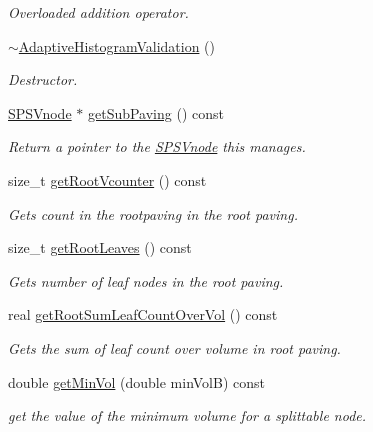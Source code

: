 \begin{DoxyCompactItemize}
\begin{DoxyCompactList}\small\item\em \-Overloaded addition operator. \end{DoxyCompactList}\item 
\hyperlink{classsubpavings_1_1AdaptiveHistogramValidation_a26664847dd161cb938bddb579946b018}{$\sim$\-Adaptive\-Histogram\-Validation} ()
\begin{DoxyCompactList}\small\item\em \-Destructor. \end{DoxyCompactList}\item 
\hyperlink{classsubpavings_1_1SPSVnode}{\-S\-P\-S\-Vnode} $\ast$ \hyperlink{classsubpavings_1_1AdaptiveHistogramValidation_a6449b127c16423141cbed8f193cfcf59}{get\-Sub\-Paving} () const 
\begin{DoxyCompactList}\small\item\em \-Return a pointer to the \hyperlink{classsubpavings_1_1SPSVnode}{\-S\-P\-S\-Vnode} this manages. \end{DoxyCompactList}\item 
size\-\_\-t \hyperlink{classsubpavings_1_1AdaptiveHistogramValidation_a23a25c2169c94e019859f8efc2657c1b}{get\-Root\-Vcounter} () const 
\begin{DoxyCompactList}\small\item\em \-Gets count in the rootpaving in the root paving. \end{DoxyCompactList}\item 
size\-\_\-t \hyperlink{classsubpavings_1_1AdaptiveHistogramValidation_abba9be0456a1228037dd40e7353d2169}{get\-Root\-Leaves} () const 
\begin{DoxyCompactList}\small\item\em \-Gets number of leaf nodes in the root paving. \end{DoxyCompactList}\item 
real \hyperlink{classsubpavings_1_1AdaptiveHistogramValidation_a22ac33f1952cfb6b605193cddab42bae}{get\-Root\-Sum\-Leaf\-Count\-Over\-Vol} () const 
\begin{DoxyCompactList}\small\item\em \-Gets the sum of leaf count over volume in root paving. \end{DoxyCompactList}\item 
double \hyperlink{classsubpavings_1_1AdaptiveHistogramValidation_a8d94391339b619f6f3aefb89ca761e99}{get\-Min\-Vol} (double min\-Vol\-B) const 
\begin{DoxyCompactList}\small\item\em get the value of the minimum volume for a splittable node. \end{DoxyCompactList}\item 

\end{DoxyCompactItemize}
